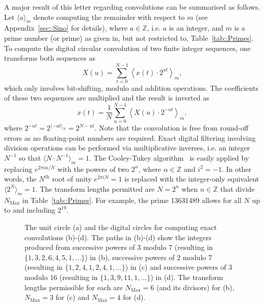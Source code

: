 \documentclass[twocolumn]{IEEEtran}
\newcommand{\modulusSymbol}{m}
\newcommand{\tabTag}{Table}
\begin{document}
A major result of this letter regarding convolutions can be summarised as follows. Let $\langle a \rangle_\modulusSymbol$ denote computing the remainder with respect to $\modulusSymbol$ (see Appendix~\ref{sec::Sino} for details), where $a \in \mathbb{Z}$, i.e. $a$ is an integer, and $\modulusSymbol$ is a prime number (or prime) as given in, but not restricted to, \tabTag~\ref{tab::Primes}. To compute the digital circular convolution of two finite integer sequences, one transforms both sequences as
\begin{equation}\label{eqn::NTT}
X(u) = \sum_{t=0}^{N-1} \left\langle x(t)\cdot 2^{ut} \right\rangle_\modulusSymbol,
\end{equation}
which only involves bit-shifting, modulo and addition operations. The coefficients of these two sequences are multiplied and the result is inverted as
\begin{equation}\label{eqn::iNTT}
 x(t) = \frac{1}{N} \sum_{u=0}^{N-1} \left\langle X(u)\cdot 2^{-ut} \right\rangle_\modulusSymbol,
\end{equation}
where $2^{-ut} = 2^{\langle -ut \rangle_N} = 2^{N-ut}$. Note that the convolution is free from round-off errors as no floating-point numbers are required. Exact digital filtering involving division operations can be performed via multiplicative inverses, i.e. an integer $N^{-1}$ so that $\langle N \cdot N^{-1} \rangle_\modulusSymbol = 1$. The Cooley-Tukey algorithm~\citep{Cooley1965} is easily applied by replacing $e^{2\pi i\alpha/N}$ with the powers of two $2^\alpha$, where $\alpha\in \mathbb{Z}$ and $i^2=-1$. In other words, the $N^{\text{th}}$ root of unity $e^{2\pi i N} = 1$ is replaced with the integer-only equivalent $\langle 2^N \rangle_\modulusSymbol = 1$. The transform lengths permitted are $N=2^n$ when $n\in \mathbb{Z}$ that divide $N_{\text{Max}}$ in \tabTag~\ref{tab::Primes}. For example, the prime 13631489 allows for all $N$ up to and including $2^{19}$.
\begin{figure}[htbp]
 \centering
  \hspace{0.75cm}
 
 \hspace{0.75cm}
 \caption{The unit circle (a) and the digital circles for computing exact convolutions (b)-(d). The paths in (b)-(d) show the integers produced from successive powers of 3 modulo 7 (resulting in $\{1,3,2,6,4,5,1,\ldots\}$) in (b), successive powers of 2 modulo 7 (resulting in $\{1,2,4,1,2,4,1,\ldots\}$) in (c) and successive powers of 3 modulo 16 (resulting in $\{1,3,9,11,1,\ldots\}$) in (d). The transform lengths permissible for each are $N_{\text{Max}}=6$ (and its divisors) for (b), $N_{\text{Max}}=3$ for (c) and $N_{\text{Max}}=4$ for (d).}
 \label{fig::Circles}
\end{figure}
\end{document}
